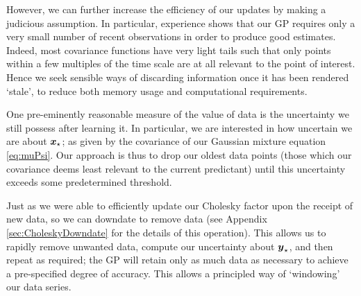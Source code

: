 \documentclass{acmtrans2m}
\begin{document}
However, we can further increase the efficiency of our updates by making a judicious assumption. In particular, experience shows that our GP requires only a very small number of recent observations in order to produce good estimates. Indeed, most covariance functions have very light tails such that only points within a few multiples of the time scale are at all relevant to the point of interest. Hence we seek sensible ways of discarding information once it has been rendered `stale', to reduce both memory usage and computational requirements.

One pre-eminently reasonable measure of the value of data is the uncertainty we still possess after learning it. In particular, we are interested in how uncertain we are about $\boldsymbol{x}_\star$; as given by the covariance of our Gaussian mixture equation \eqref{eq:muPsi}. Our approach is thus to drop our oldest data points (those which our covariance deems least relevant to the current predictant) until this uncertainty exceeds some predetermined threshold. 

Just as we were able to efficiently update our Cholesky factor upon the receipt of new data, so we can downdate to remove data (see Appendix \ref{sec:CholeskyDowndate} for the details of this operation). This allows us to rapidly remove unwanted data, compute our uncertainty about $\boldsymbol{y}_\star$, and then repeat as required; the GP will retain only as much data as necessary to achieve a pre-specified degree of accuracy. This allows a principled way of `windowing' our data series.
\end{document}
